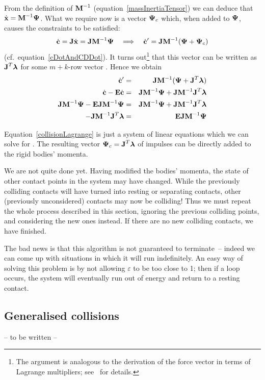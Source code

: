 From the definition of $\m{M}^{-1}$ (equation~\ref{massInertiaTensor}) we can deduce that
$\dot{\ve{x}} = \m{M}^{-1}\ve{\Psi}$. What we require now is a vector $\ve{\Psi}_c$ which, when
added to $\ve{\Psi}$, causes the constraints to be satisfied:
\begin{equation}
\dot{\ve{c}} = \m{J}\dot{\ve{x}} = \m{J}\m{M}^{-1}\ve{\Psi} \quad\Longrightarrow\quad
    \dot{\ve{c}}' = \m{J}\m{M}^{-1}(\ve{\Psi} + \ve{\Psi}_c)
\end{equation}
(cf.\ equation~\ref{cDotAndCDDot}).
It turns out\footnote{The argument is analogous to the derivation of the force vector in terms of
Lagrange multipliers; see~\cite{BaraffWitkin:97} for details.} that this vector can be written as
$\m{J}^T\ve{\lambda}$ for some $m+k$-row vector \ve{\lambda}. Hence we obtain
\begin{eqnarray}
\dot{\ve{c}}' &=& \m{J}\m{M}^{-1}(\ve{\Psi} + \m{J}^T\ve{\lambda}) \nonumber\\
\dot{\ve{c}} - \m{E}\dot{\ve{c}} &=&
    \m{J}\m{M}^{-1}\ve{\Psi} + \m{J}\m{M}^{-1}\m{J}^T\ve{\lambda} \nonumber\\
\m{J}\m{M}^{-1}\ve{\Psi} - \m{E}\m{J}\m{M}^{-1}\ve{\Psi} & = &
    \m{J}\m{M}^{-1}\ve{\Psi} + \m{J}\m{M}^{-1}\m{J}^T\ve{\lambda} \nonumber\\
-\m{J}\m{M}^{-1}\m{J}^T\ve{\lambda} &=& \m{E}\m{J}\m{M}^{-1}\ve{\Psi} \label{collisionLagrange}
\end{eqnarray}

Equation~\ref{collisionLagrange} is just a system of linear equations which we can solve for
\ve{\lambda}. The resulting vector $\ve{\Psi}_c = \m{J}^T\ve{\lambda}$ of impulses can be
directly added to the rigid bodies' momenta.

We are not quite done yet. Having modified the bodies' momenta, the state of other contact points
in the system may have changed. While the previously colliding contacts will have
turned into resting or separating contacts, other (previously unconsidered) contacts may now
be colliding! Thus we must repeat the whole process described in this section, ignoring the
previous colliding points, and considering the new ones instead. If there are no new colliding
contacts, we have finished.

The bad news is that this algorithm is not guaranteed to terminate~-- indeed we can come up with
situations in which it will run indefinitely. An easy way of solving this problem is by not
allowing $\varepsilon$ to be too close to 1; then if a loop occurs, the system will eventually
run out of energy and return to a resting contact.


\subsection{Generalised collisions}

-- to be written --
